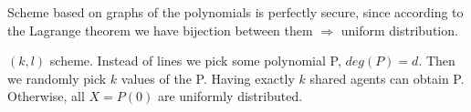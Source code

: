 \begin{consequence}
	Scheme based on graphs of the polynomials is perfectly secure, since according to the Lagrange theorem we have bijection between them $\Rightarrow$ uniform distribution.
\end{consequence}

\begin{example}
	$(k, l)$ scheme. Instead of lines we pick some polynomial P, $deg(P) = d$. Then we randomly pick $k$ values of the P.
	Having exactly $k$ shared agents can obtain P. Otherwise, all $X = P(0)$ are uniformly distributed.
\end{example}
